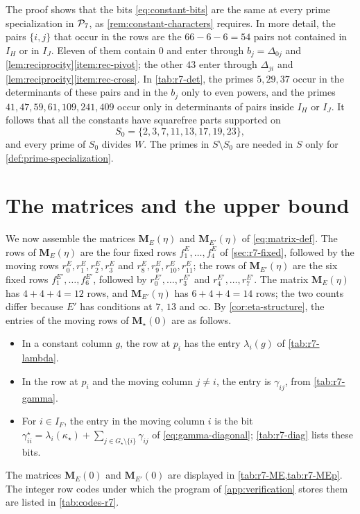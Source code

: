The proof shows that the bits \eqref{eq:constant-bits} are the same at every
prime specialization in $\mathcal P_7$, as \cref{rem:constant-characters}
requires. In more detail, the pairs $\{i,j\}$ that occur in the rows are the
$66-6-6=54$ pairs not contained in $I_H$ or in $I_J$. Eleven of them contain
$0$ and enter through $b_j=\Delta_{0j}$ and
\cref{lem:reciprocity}\ref{item:rec-pivot}; the other $43$ enter through
$\Delta_{ji}$ and \cref{lem:reciprocity}\ref{item:rec-cross}.
In \cref{tab:r7-det}, the primes $5,29,37$ occur in the determinants of
these pairs and in the $b_j$ only to even powers, and the primes
$41,47,59,61,109,241,409$ occur only in determinants of pairs inside $I_H$
or $I_J$. It follows that all the constants have squarefree parts
supported on
\[
 S_0=\{2,3,7,11,13,17,19,23\},
\]
and every prime of $S_0$ divides $W$. The primes in $S\setminus S_0$ are
needed in $S$ only for \cref{def:prime-specialization}.

\section{The matrices and the upper bound}\label{sec:r7-matrices}

We now assemble the matrices $\mathbf M_E(\eta)$ and $\mathbf M_{E'}(\eta)$
of \eqref{eq:matrix-def}. The rows of $\mathbf M_E(\eta)$ are the four fixed
rows $f^E_1,\dots,f^E_4$ of \cref{sec:r7-fixed}, followed by the moving rows
$r^E_0,r^E_1,r^E_2,r^E_3$ and $r^E_8,r^E_9,r^E_{10},r^E_{11}$; the rows of
$\mathbf M_{E'}(\eta)$ are the six fixed rows $f^{E'}_1,\dots,f^{E'}_6$,
followed by $r^{E'}_0,\dots,r^{E'}_3$ and $r^{E'}_4,\dots,r^{E'}_7$. The matrix $\mathbf M_E(\eta)$ has $4+4+4=12$ rows, and $\mathbf M_{E'}(\eta)$ has
$6+4+4=14$ rows; the two counts differ because $E'$ has conditions at $7$,
$13$ and $\infty$. By \cref{cor:eta-structure}, the entries of the moving
rows of $\mathbf M_\star(0)$ are as follows.
\begin{itemize}
\item In a constant column $g$, the row at $p_i$ has the entry
$\lambda_i(g)$ of \cref{tab:r7-lambda}.
\item In the row at $p_i$ and the moving column $j\ne i$, the entry is
$\gamma_{ij}$, from \cref{tab:r7-gamma}.
\item For $i\in I_F$, the entry in the moving column $i$ is the bit
$\gamma^\star_{ii}=\lambda_i(\kappa_\star)+\sum_{j\in G_\star\setminus\{i\}}\gamma_{ij}$
of \eqref{eq:gamma-diagonal}; \cref{tab:r7-diag} lists these bits.
\end{itemize}
The matrices $\mathbf M_E(0)$ and $\mathbf M_{E'}(0)$ are displayed in
\cref{tab:r7-ME,tab:r7-MEp}. The integer row codes under which the program
of \cref{app:verification} stores them are listed in
\cref{tab:codes-r7}.

